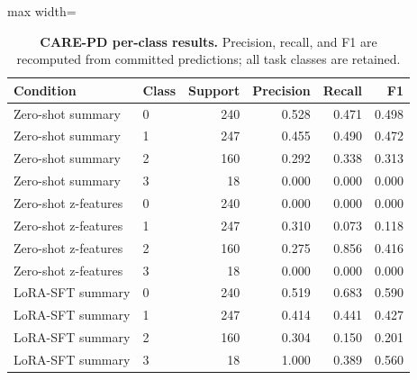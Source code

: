 \begin{table}[H]
\centering
\caption{\textbf{CARE-PD per-class results.} Precision, recall, and F1 are recomputed from committed predictions; all task classes are retained.}
\label{tab:per_class_care_pd}
\small
\begin{adjustbox}{max width=\textwidth}
\begin{tabular}{llrrrr}
\toprule
Condition & Class & Support & Precision & Recall & F1 \\
\midrule
Zero-shot summary & 0 & 240 & 0.528 & 0.471 & 0.498 \\
Zero-shot summary & 1 & 247 & 0.455 & 0.490 & 0.472 \\
Zero-shot summary & 2 & 160 & 0.292 & 0.338 & 0.313 \\
Zero-shot summary & 3 & 18 & 0.000 & 0.000 & 0.000 \\
Zero-shot z-features & 0 & 240 & 0.000 & 0.000 & 0.000 \\
Zero-shot z-features & 1 & 247 & 0.310 & 0.073 & 0.118 \\
Zero-shot z-features & 2 & 160 & 0.275 & 0.856 & 0.416 \\
Zero-shot z-features & 3 & 18 & 0.000 & 0.000 & 0.000 \\
LoRA-SFT summary & 0 & 240 & 0.519 & 0.683 & 0.590 \\
LoRA-SFT summary & 1 & 247 & 0.414 & 0.441 & 0.427 \\
LoRA-SFT summary & 2 & 160 & 0.304 & 0.150 & 0.201 \\
LoRA-SFT summary & 3 & 18 & 1.000 & 0.389 & 0.560 \\
\bottomrule
\end{tabular}
\end{adjustbox}
\end{table}
